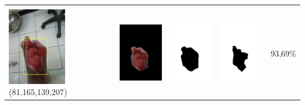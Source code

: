 \begin{table}[H]
\begin{tabular}{|m{1.0in}|m{1.0in}|m{1.0in}|m{1.0in}|m{0.6in}|}
		&  &  & \\
		\includegraphics[width=1.0in]{gambar/hasil_segmentasi/luka_merah/image_4_rect.jpg} {\centering\fontsize{10}{10}\selectfont(81,165,139,207)}&
		\includegraphics[width=1.0in]{gambar/hasil_segmentasi/luka_merah/result_4.jpg}&
		\includegraphics[width=1.0in]{gambar/hasil_segmentasi/luka_merah/mask_r_4.jpg}&
		\includegraphics[width=1.0in]{gambar/hasil_segmentasi/luka_merah/4_r.jpg}&
		93,69\% \\
		\hline
				

\end{tabular}
\end{table}
